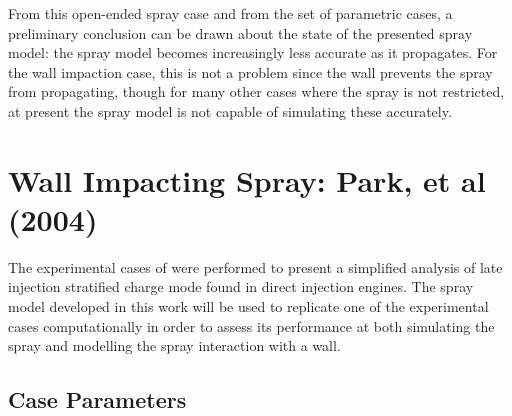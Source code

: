 \documentclass[a4paper,10pt]{article}
\begin{document}
From this open-ended spray case and from the set of parametric cases, a preliminary conclusion can be drawn about the state of the presented spray model: the spray model becomes increasingly less accurate as it propagates. For the wall impaction case, this is not a problem since the wall prevents the spray from propagating, though for many other cases where the spray is not restricted, at present the spray model is not capable of simulating these accurately.


\section{Wall Impacting Spray: Park, et al (2004)} \label{sec:wall_imp_case}
The experimental cases of \cite{park2004} were performed to present a simplified analysis of late injection stratified charge mode found in direct injection engines. The spray model developed in this work will be used to replicate one of the experimental cases computationally in order to assess its performance at both simulating the spray and modelling the spray interaction with a wall.



\subsection{Case Parameters}
\end{document}
